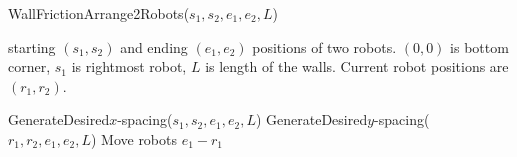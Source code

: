 %

\begin{algorithm}
\caption{WallFrictionArrange2Robots($s_1,s_2,e_1,e_2,L$)}\label{alg:PosControl2Robots}
\begin{algorithmic}[1]
\Require starting $(s_1,s_2)$ and ending $(e_1,e_2)$ positions of  two robots. 
$(0,0)$ is bottom corner, $s_1$ is rightmost robot, 
 $L$ is length of the walls. 
 Current robot positions are $(r_1,r_2)$.

\State  GenerateDesired$x$-spacing($s_1,s_2,e_1,e_2,L$)
\State  GenerateDesired$y$-spacing($r_1,r_2,e_1,e_2,L$)
\State Move robots $e_1 - r_1$

\end{algorithmic}
\end{algorithm}



